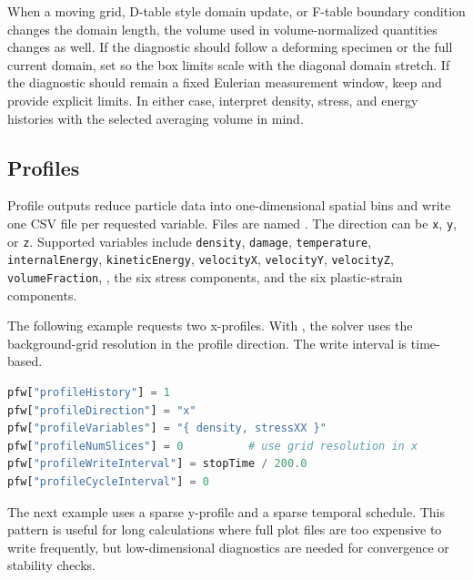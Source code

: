 When a moving grid, D-table style domain update, or F-table boundary condition changes the domain length, the volume used in volume-normalized quantities changes as well.  If the diagnostic should follow a deforming specimen or the full current domain, set  so the box limits scale with the diagonal domain stretch.  If the diagnostic should remain a fixed Eulerian measurement window, keep  and provide explicit limits.  In either case, interpret density, stress, and energy histories with the selected averaging volume in mind.

\subsection{Profiles}
\label{subsec:pfw-profiles}

Profile outputs reduce particle data into one-dimensional spatial bins and write one CSV file per requested variable.  Files are named .  The direction can be \texttt{x}, \texttt{y}, or \texttt{z}.  Supported variables include \texttt{density}, \texttt{damage}, \texttt{temperature}, \texttt{internalEnergy}, \texttt{kineticEnergy}, \texttt{velocityX}, \texttt{velocityY}, \texttt{velocityZ}, \texttt{volumeFraction}, , the six stress components, and the six plastic-strain components.

The following example requests two x-profiles.  With , the solver uses the background-grid resolution in the profile direction.  The write interval is time-based.

\begin{lstlisting}[language=Python,caption={X-profiles of density and axial stress using grid-cell spacing.}]
pfw["profileHistory"] = 1
pfw["profileDirection"] = "x"
pfw["profileVariables"] = "{ density, stressXX }"
pfw["profileNumSlices"] = 0          # use grid resolution in x
pfw["profileWriteInterval"] = stopTime / 200.0
pfw["profileCycleInterval"] = 0
\end{lstlisting}

The next example uses a sparse y-profile and a sparse temporal schedule.  This pattern is useful for long calculations where full plot files are too expensive to write frequently, but low-dimensional diagnostics are needed for convergence or stability checks.

